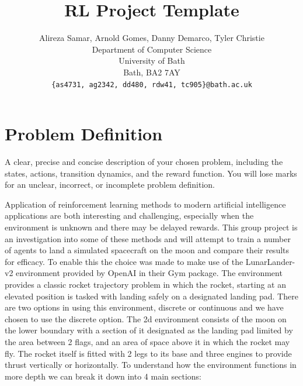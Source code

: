 \documentclass{article}
\title{RL Project Template}
\author{
  Alireza Samar, Arnold Gomes, Danny Demarco, Tyler Christie
  \\
  Department of Computer Science\\
  University of Bath\\
  Bath, BA2 7AY \\
  \texttt{\{as4731, ag2342, dd480, rdw41, tc905\}@bath.ac.uk} \\
}
\begin{document}
\maketitle

\section{Problem Definition}
A clear, precise and concise description of your chosen problem,
including the states, actions, transition dynamics, and the reward function. You will lose
marks for an unclear, incorrect, or incomplete problem definition.

Application of reinforcement learning methods to modern artificial intelligence applications are both interesting and challenging, especially when the environment is unknown and there may be delayed rewards. This group project is an investigation into some of these methods and will attempt to train a number of agents to land a simulated spacecraft on the moon and compare their results for efficacy. To enable this the choice was made to make use of the LunarLander-v2 environment provided by OpenAI in their Gym package. The environment provides a classic rocket trajectory problem in which the rocket, starting at an elevated position is tasked with landing safely on a designated landing pad. There are two options in using this environment, discrete or continuous and we have chosen to use the discrete option. The 2d environment consists of the moon on the lower boundary with a section of it designated as the landing pad limited by the area between 2 flags, and an area of space above it in which the rocket may fly. The rocket itself is fitted with 2 legs to its base and three engines to provide thrust vertically or horizontally. To understand how the environment functions in more depth we can break it down into 4 main sections:
\end{document}

